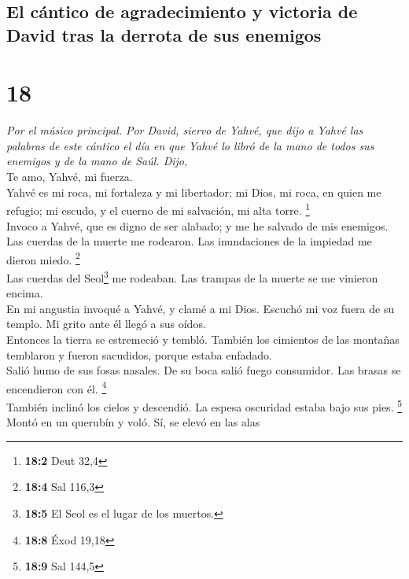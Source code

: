 \hypertarget{el-cuxe1ntico-de-agradecimiento-y-victoria-de-david-tras-la-derrota-de-sus-enemigos}{%
\subsection{El cántico de agradecimiento y victoria de David tras la
derrota de sus
enemigos}\label{el-cuxe1ntico-de-agradecimiento-y-victoria-de-david-tras-la-derrota-de-sus-enemigos}}

\hypertarget{section-17}{%
\section{18}\label{section-17}}

\emph{Por el músico principal. Por David, siervo de Yahvé, que dijo a
Yahvé las palabras de este cántico el día en que Yahvé lo libró de la
mano de todos sus enemigos y de la mano de Saúl. Dijo,}\\
 Te amo, Yahvé, mi fuerza.\\
 Yahvé es mi roca, mi fortaleza y mi libertador; mi Dios,
mi roca, en quien me refugio; mi escudo, y el cuerno de mi salvación, mi
alta torre. \footnote{\textbf{18:2} Deut 32,4}\\
 Invoco a Yahvé, que es digno de ser alabado; y me he
salvado de mis enemigos.\\
 Las cuerdas de la muerte me rodearon. Las inundaciones de
la impiedad me dieron miedo. \footnote{\textbf{18:4} Sal 116,3}\\
 Las cuerdas del Seol\footnote{\textbf{18:5} El Seol es el
  lugar de los muertos.} me rodeaban. Las trampas de la muerte se me
vinieron encima.\\
 En mi angustia invoqué a Yahvé, y clamé a mi Dios.
Escuchó mi voz fuera de su templo. Mi grito ante él llegó a sus oídos.\\
 Entonces la tierra se estremeció y tembló. También los
cimientos de las montañas temblaron y fueron sacudidos, porque estaba
enfadado.\\
 Salió humo de sus fosas nasales. De su boca salió fuego
consumidor. Las brasas se encendieron con él. \footnote{\textbf{18:8}
  Éxod 19,18}\\
 También inclinó los cielos y descendió. La espesa
oscuridad estaba bajo sus pies. \footnote{\textbf{18:9} Sal 144,5}\\
 Montó en un querubín y voló. Sí, se elevó en las alas
